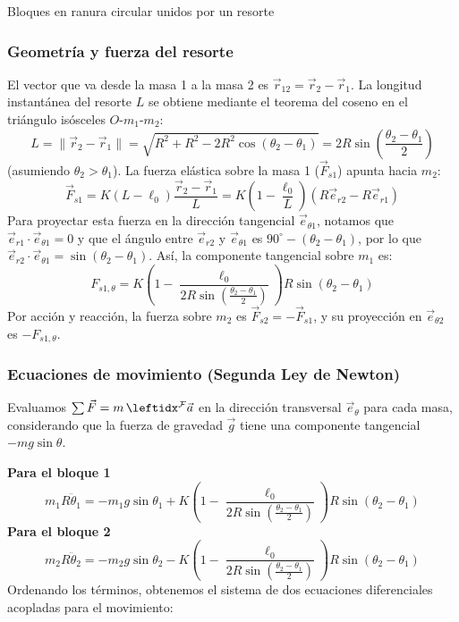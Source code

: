 \begin{solucion}{Bloques en ranura circular unidos por un resorte}
\subsubsection*{Geometría y fuerza del resorte}
El vector que va desde la masa 1 a la masa 2 es $\vec{r}_{12} = \vec{r}_2 - \vec{r}_1$. La longitud instantánea del resorte $L$ se obtiene mediante el teorema del coseno en el triángulo isósceles $O$-$m_1$-$m_2$:
$$L = \|\vec{r}_2 - \vec{r}_1\| = \sqrt{R^2 + R^2 - 2R^2\cos(\theta_2 - \theta_1)} = 2R\sin\left(\frac{\theta_2 - \theta_1}{2}\right)$$
(asumiendo $\theta_2 > \theta_1$). La fuerza elástica sobre la masa 1 ($\vec{F}_{s1}$) apunta hacia $m_2$:
$$\vec{F}_{s1} = K(L - \ell_0) \frac{\vec{r}_2 - \vec{r}_1}{L} = K\left(1 - \frac{\ell_0}{L}\right)(R\vec{e}_{r2} - R\vec{e}_{r1})$$
Para proyectar esta fuerza en la dirección tangencial $\vec{e}_{\theta 1}$, notamos que $\vec{e}_{r1} \cdot \vec{e}_{\theta 1} = 0$ y que el ángulo entre $\vec{e}_{r2}$ y $\vec{e}_{\theta 1}$ es $90^\circ - (\theta_2 - \theta_1)$, por lo que $\vec{e}_{r2} \cdot \vec{e}_{\theta 1} = \sin(\theta_2 - \theta_1)$. Así, la componente tangencial sobre $m_1$ es:
$$F_{s1,\theta} = K\left(1 - \frac{\ell_0}{2R\sin\left(\frac{\theta_2 - \theta_1}{2}\right)}\right)R\sin(\theta_2 - \theta_1)$$
Por acción y reacción, la fuerza sobre $m_2$ es $\vec{F}_{s2} = -\vec{F}_{s1}$, y su proyección en $\vec{e}_{\theta 2}$ es $-F_{s1,\theta}$.

\subsubsection*{Ecuaciones de movimiento (Segunda Ley de Newton)}
Evaluamos $\sum \vec{F} = m\,\marc{\vec{a}}{F}{}$ en la dirección transversal $\vec{e}_\theta$ para cada masa, considerando que la fuerza de gravedad $\vec{g}$ tiene una componente tangencial $-mg\sin\theta$.

\textbf{Para el bloque 1}
$$m_1 R \ddot{\theta}_1 = -m_1 g \sin\theta_1 + K\left(1 - \frac{\ell_0}{2R\sin\left(\frac{\theta_2 - \theta_1}{2}\right)}\right)R\sin(\theta_2 - \theta_1)$$
\textbf{Para el bloque 2}
$$m_2 R \ddot{\theta}_2 = -m_2 g \sin\theta_2 - K\left(1 - \frac{\ell_0}{2R\sin\left(\frac{\theta_2 - \theta_1}{2}\right)}\right)R\sin(\theta_2 - \theta_1)$$
Ordenando los términos, obtenemos el sistema de dos ecuaciones diferenciales acopladas para el movimiento:


\end{solucion}
